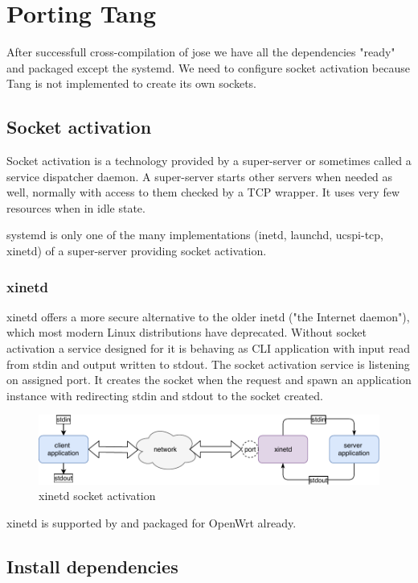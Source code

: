 \chapter{Porting Tang}\label{porting-tang}

After successfull cross-compilation of jose we have all the dependencies "ready" and packaged except the systemd.
We need to configure socket activation because Tang is not implemented to create its own sockets.


\section{Socket activation}

Socket activation is a technology provided by a super-server or sometimes called a service dispatcher daemon.
A super-server starts other servers when needed as well, normally with access to them checked by a TCP wrapper.
It uses very few resources when in idle state.

systemd is only one of the many implementations (inetd, launchd, ucspi-tcp, xinetd) of a super-server providing socket activation.



\subsection{xinetd}
xinetd offers a more secure alternative to the older inetd ("the Internet daemon"), which most modern Linux distributions have deprecated.
Without socket activation a service designed for it is behaving as CLI application with input read from stdin and output written to stdout.
The socket activation service is listening on assigned port.
It creates the socket when the request and spawn an application instance with redirecting stdin and stdout to the socket created.
\begin{figure}[h]
    \centering
    \includegraphics[scale=0.9]{figures/xinetd.pdf}
    \caption{xinetd socket activation}
    \label{fig_xinetd}
\end{figure}
xinetd is supported by and packaged for OpenWrt already.
\section{Install dependencies}

